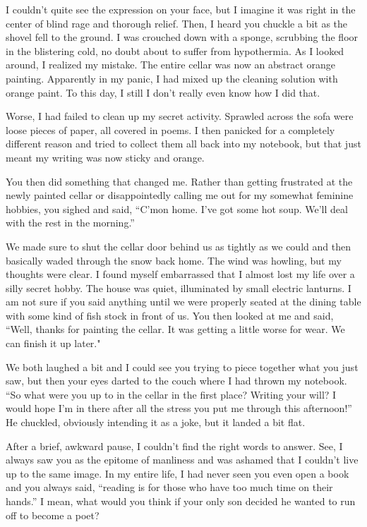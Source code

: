 I couldn't quite see the expression on your face, but I imagine it was right in the center of blind rage and thorough relief.
Then, I heard you chuckle a bit as the shovel fell to the ground.
I was crouched down with a sponge, scrubbing the floor in the blistering cold, no doubt about to suffer from hypothermia.
As I looked around, I realized my mistake.
The entire cellar was now an abstract orange painting.
Apparently in my panic, I had mixed up the cleaning solution with orange paint.
To this day, I still I don't really even know how I did that.

Worse, I had failed to clean up my secret activity.
Sprawled across the sofa were loose pieces of paper, all covered in poems.
I then panicked for a completely different reason and tried to collect them all back into my notebook, but that just meant my writing was now sticky and orange.

You then did something that changed me.
Rather than getting frustrated at the newly painted cellar or disappointedly calling me out for my somewhat feminine hobbies, you sighed and said, ``C'mon home. I've got some hot soup. We'll deal with the rest in the morning.''

We made sure to shut the cellar door behind us as tightly as we could and then basically waded through the snow back home.
The wind was howling, but my thoughts were clear.
I found myself embarrassed that I almost lost my life over a silly secret hobby.
The house was quiet, illuminated by small electric lanturns.
I am not sure if you said anything until we were properly seated at the dining table with some kind of fish stock in front of us.
You then looked at me and said, ``Well, thanks for painting the cellar. It was getting a little worse for wear. We can finish it up later."

We both laughed a bit and I could see you trying to piece together what you just saw, but then your eyes darted to the couch where I had thrown my notebook.
``So what were you up to in the cellar in the first place? Writing your will? I would hope I'm in there after all the stress you put me through this afternoon!''
He chuckled, obviously intending it as a joke, but it landed a bit flat.

After a brief, awkward pause, I couldn't find the right words to answer.
See, I always saw you as the epitome of manliness and was ashamed that I couldn't live up to the same image.
In my entire life, I had never seen you even open a book and you always said, ``reading is for those who have too much time on their hands.''
I mean, what would you think if your only son decided he wanted to run off to become a poet?

